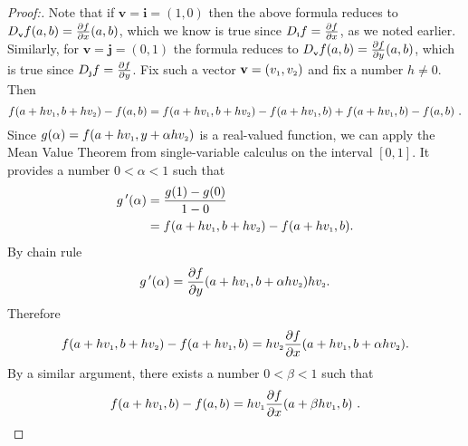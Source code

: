 \begin{proofbar}\vspace{-3mm}\begin{proof}[Proof:]
 Note that if $\textbf{v} = \textbf{i} = (1,0)$ then the above formula reduces to
 $D_{\scriptscriptstyle \textbf{v}}f(a,b) = \tfrac{\partial f}{\partial x}(a,b)$, which we know is true since
 $D_{\scriptscriptstyle \textbf{i}}f = \tfrac{\partial f}{\partial x}$, as we noted earlier. Similarly, for
 $\textbf{v} = \textbf{j} = (0,1)$ the formula reduces to $D_{\scriptscriptstyle \textbf{v}}f(a,b) =
 \tfrac{\partial f}{\partial y}(a,b)$, which is true since $D_{\scriptscriptstyle \textbf{j}}f = \tfrac{\partial f}{\partial y}$.
 Fix such a vector $\textbf{v} = (v_{\scriptscriptstyle 1},v_{\scriptscriptstyle 2})$ and fix a number $h \ne 0$.
Then
 \begin{equation}\label{eqn:dirderivdiff}
  f(a+hv_{\scriptscriptstyle 1},b+hv_{\scriptscriptstyle 2}) - f(a,b) = f(a+hv_{\scriptscriptstyle 1},b+hv_{\scriptscriptstyle 2}) - f(a+hv_{\scriptscriptstyle 1},b) +
   f(a+hv_{\scriptscriptstyle 1},b) - f(a,b) ~.
 \end{equation}
 Since $g(\alpha)=f(a+hv_{\scriptscriptstyle 1},y+\alpha hv_{\scriptscriptstyle 2})$ is a real-valued function,
 we can apply
 the Mean Value Theorem from single-variable calculus on the interval $[0,1]$.
 It provides a number $0 < \alpha < 1$ such that
 \begin{align*}
  g\,'(\alpha) 
  &= 
   \frac{g(1) - g(0)}{1-0} 
   \\
   &=
   f(a+hv_{\scriptscriptstyle 1},b+hv_{\scriptscriptstyle 2}) - f(a+hv_{\scriptscriptstyle 1},b).
 \end{align*}
 By chain rule
 \[g\,'(\alpha)=\frac{\partial f}{\partial y}(a+hv_{\scriptscriptstyle 1},b+\alpha hv_{\scriptscriptstyle 2}) hv_{\scriptscriptstyle 2}.\]
 Therefore 
 \[f(a+hv_{\scriptscriptstyle 1},b+hv_{\scriptscriptstyle 2}) - f(a+hv_{\scriptscriptstyle 1},b)
 =
 hv_{\scriptscriptstyle 2}\frac{\partial f}{\partial x}(a+hv_{\scriptscriptstyle 1},b+\alpha hv_{\scriptscriptstyle 2}) .\]
 By a similar argument, there exists a number $0 < \beta < 1$ such that
 \begin{displaymath}
  f(a+h\ssub{v}{1},b) - f(a,b) = h\ssub{v}{1} \frac{\partial f}{\partial x}(a+\beta h\ssub{v}{1},b) ~.

\end{displaymath}
\end{proof}
\end{proofbar}
